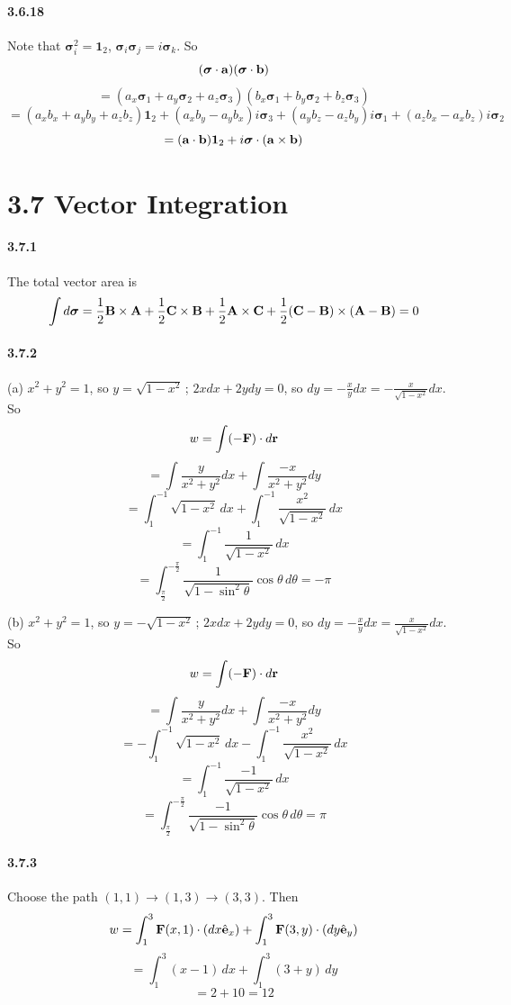 \documentclass[a4paper]{article}
\begin{document}
\paragraph{3.6.18}
Note that $\boldsymbol{\sigma}_i^2=\boldsymbol{1}_2$, $\boldsymbol{\sigma}_i\boldsymbol{\sigma}_j=i\boldsymbol{\sigma}_k$. So 
\[
(\boldsymbol{\sigma}\cdot\mathbf{a})(\boldsymbol{\boldsymbol{\sigma}}\cdot\mathbf{b})\]
\[
=(a_x\boldsymbol{\sigma}_1+a_y\boldsymbol{\sigma}_2+a_z\boldsymbol{\sigma}_3)(b_x\boldsymbol{\sigma}_1+b_y\boldsymbol{\sigma}_2+b_z\boldsymbol{\sigma}_3)
\]
\[
=(a_xb_x+a_yb_y+a_zb_z)\boldsymbol{1}_2+(a_xb_y-a_yb_x)i\boldsymbol{\sigma}_3+(a_yb_z-a_zb_y)i\boldsymbol{\sigma}_1+(a_zb_x-a_xb_z)i\boldsymbol{\sigma}_2
\]
\[
=(\mathbf{a}\cdot\mathbf{b})\boldsymbol{1}_2+i\boldsymbol{\sigma}\cdot(\mathbf{a}\times\mathbf{b})
\]

\section*{3.7 Vector Integration}

\paragraph{3.7.1}
The total vector area is 
\[
\int d\boldsymbol{\sigma}=\frac{1}{2}\mathbf{B}\times\mathbf{A}+\frac{1}{2}\mathbf{C}\times\mathbf{B}+\frac{1}{2}\mathbf{A}\times\mathbf{C}+\frac{1}{2}(\mathbf{C}-\mathbf{B})\times(\mathbf{A}-\mathbf{B})=0
\]

\paragraph{3.7.2}
(a) $x^2+y^2=1$, so $y=\sqrt{1-x^2}$\,; $2xdx+2ydy=0$, so $dy=-\frac{x}{y}dx=-\frac{x}{\sqrt{1-x^2}}dx$. So
\[
w=\int(-\mathbf{F})\cdot d\mathbf{r}\]
\[=\int\frac{y}{x^2+y^2}dx+\int\frac{-x}{x^2+y^2}dy\]
\[=\int_1^{-1}\sqrt{1-x^2}\,dx+\int_1^{-1}\frac{x^2}{\sqrt{1-x^2}}\,dx\]
\[=\int_1^{-1}\frac{1}{\sqrt{1-x^2}}\,dx\]
\[=\int_{\frac{\pi}{2}}^{-\frac{\pi}{2}}\frac{1}{\sqrt{1-\sin^2\theta}}\cos\theta\,d\theta=-\pi\]

(b) $x^2+y^2=1$, so $y=-\sqrt{1-x^2}$\,; $2xdx+2ydy=0$, so $dy=-\frac{x}{y}dx=\frac{x}{\sqrt{1-x^2}}dx$. So
\[
w=\int(-\mathbf{F})\cdot d\mathbf{r}\]
\[=\int\frac{y}{x^2+y^2}dx+\int\frac{-x}{x^2+y^2}dy\]
\[=-\int_1^{-1}\sqrt{1-x^2}\,dx-\int_1^{-1}\frac{x^2}{\sqrt{1-x^2}}\,dx\]
\[=\int_1^{-1}\frac{-1}{\sqrt{1-x^2}}\,dx\]
\[=\int_{\frac{\pi}{2}}^{-\frac{\pi}{2}}\frac{-1}{\sqrt{1-\sin^2\theta}}\cos\theta\,d\theta=\pi\]

\paragraph{3.7.3}
Choose the path $(1,1)\rightarrow(1,3)\rightarrow(3,3)$. Then 
\[
w=\int_1^3\mathbf{F}(x,1)\cdot(dx\hat{\mathbf{e}}_x)+\int_1^3\mathbf{F}(3,y)\cdot(dy\hat{\mathbf{e}}_y)
\]
\[
=\int_1^3(x-1)\,dx+\int_1^3(3+y)\,dy
\]
\[
=2+10=12
\]
\end{document}
